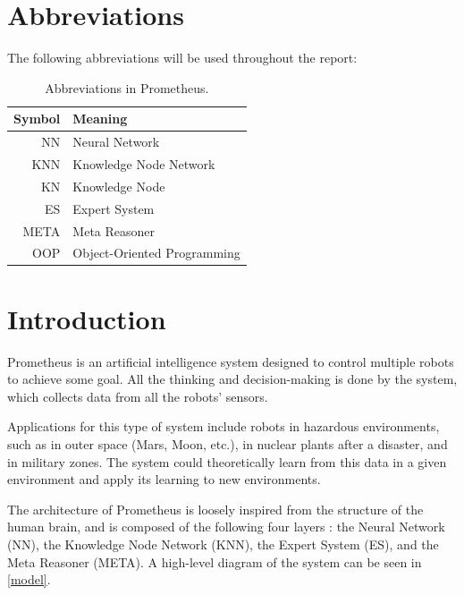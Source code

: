 \documentclass[titlepage,11pt]{article}
\begin{document}
\clearpage
\tableofcontents

\listoffigures
\listoftables
\clearpage

\twocolumn

\section*{Abbreviations}

The following abbreviations will be used throughout the report:

\begin{table}[!htb]
	\centering
	\caption{Abbreviations in Prometheus.}
	\begin{tabular}{r | l}
		\textbf{Symbol} & \textbf{Meaning} \\ \hline
		NN & Neural Network \\
		KNN & Knowledge Node Network \\
		KN & Knowledge Node \\
		ES & Expert System \\
		META & Meta Reasoner \\
		OOP & Object-Oriented Programming
	\end{tabular}
	\label{table:abbrevations}
\end{table}

\section{Introduction} \label{sec:intro}

Prometheus is an artificial intelligence system designed to control multiple robots to achieve some goal. All the thinking and decision-making is done by the system, which collects data from all the robots' sensors.

Applications for this type of system include robots in hazardous environments, such as in outer space (Mars, Moon, etc.), in nuclear plants after a disaster, and in military zones.  The system could theoretically learn from this data in a given environment and apply its learning to new environments.

The architecture of Prometheus is loosely inspired from the structure of the human brain, and is composed of the following four layers \cite{vybihal-model}: the Neural Network (NN), the Knowledge Node Network (KNN), the Expert System (ES), and the Meta Reasoner (META). A high-level diagram of the system can be seen in \autoref{model}.
\end{document}
